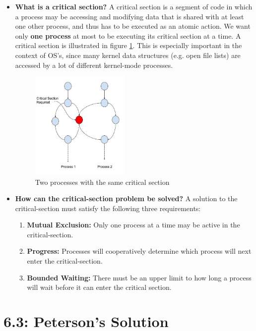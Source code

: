 \documentclass[12pt]{article}
\begin{document}
\begin{itemize}
    \item \textbf{What is a critical section?} A critical section is a segment of code in which a process may be accessing and modifying data that is shared with at least one other process, and thus has to be executed as an atomic action. We want only \textbf{one process} at most to be executing its critical section at a time. A critical section is illustrated in figure \ref{fig:critical-section}. This is especially important in the context of OS's, since many kernel data structures (e.g. open file lists) are accessed by a lot of different kernel-mode processes.
    \begin{figure}[ht]
        \centering
        \includegraphics[width=0.45\textwidth]{figures/critical-section.jpg}
        \caption{Two processes with the same critical section}
        \label{fig:critical-section}
    \end{figure}
    \item \textbf{How can the critical-section problem be solved?} A solution to the critical-section must satisfy the following three requirements:
    \begin{enumerate}
        \item \textbf{Mutual Exclusion:} Only one process at a time may be active in the critical-section.
        \item \textbf{Progress:} Processes will cooperatively determine which process will next enter the critical-section.
        \item \textbf{Bounded Waiting:} There must be an upper limit to how long a process will wait before it can enter the critical section.
    \end{enumerate}
\end{itemize}

\section*{6.3: Peterson's Solution}
\end{document}
